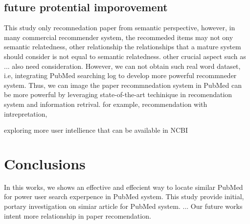\documentclass[11pt]{article}
\begin{document}
    \subsection{future protential imporovement}

    This study only recomnedation paper from semantic perspective, however, in many commercial recommender system, the recommeded items may not ony semantic relatedness, other relationship
    the relationships that a mature system should consider is not equal to semantic relatedness. other crucial aspect such as ... also need consideration.
    However, we can not obtain such real word dataset, i.e, integrating PubMed searching log to develop more powerful recommneder system.
    Thus, we can image the paper recommnedation system in PubMed can be more powerful by leveraging state-of-the-art techinique in recomendation system and information retrival.
    for example, recommendation with intrepretation,

    exploring more user intellience that can be available in NCBI


    \section{Conclusions}
    In this works, we shows an effective and effecient way to locate similar PubMed for power user search experpence in PubMed system.
    This study provide initial, portary investigation on simiar article for PubMed system.
    ...
    Our future works intent more relationship in paper recomendation.

    
    
\end{document}
